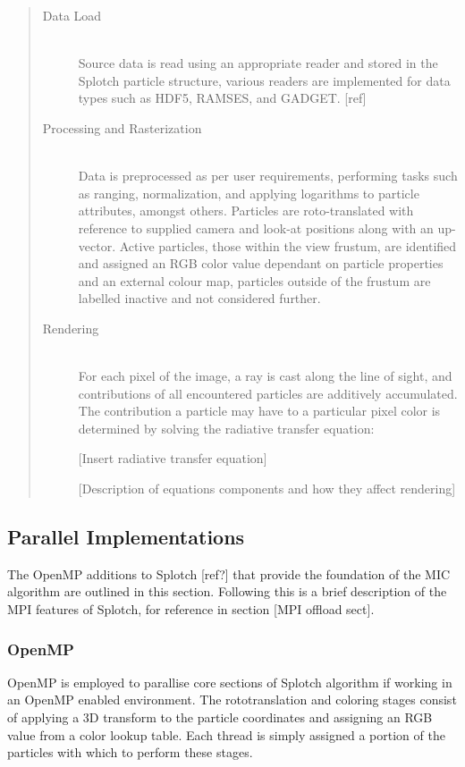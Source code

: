 \documentclass{easychair}
\begin{document}
\begin{quote} %
\begin{description}
  \item[Data Load] \hfill \\
  Source data is read using an appropriate reader and stored in the Splotch particle structure, various readers are 
  implemented for data types such as HDF5, RAMSES, and GADGET. [ref]
  \item[Processing and Rasterization] \hfill \\
   Data is preprocessed as per user requirements, performing tasks such as ranging, normalization, and applying 
   logarithms to particle attributes, amongst others. Particles are roto-translated with reference to supplied 
   camera and look-at positions along with an up-vector. Active particles, those within the view frustum, are 
   identified and assigned an RGB color value dependant on particle properties and an external colour map, 
   particles outside of the frustum are labelled inactive and not  considered further.  
  \item[Rendering] \hfill \\
  For each pixel of the image, a ray is cast along the line of sight, and contributions of all encountered particles 
  are additively accumulated. The contribution a particle may have to a particular pixel color is determined by solving 
  the radiative transfer equation:

  [Insert radiative transfer equation]

  [Description of equations components and how they affect rendering]
\end{description}
\end{quote}

\subsection{Parallel Implementations}
\label{sect:mpiopenmp}

The OpenMP additions to Splotch [ref?] that provide the foundation of the MIC algorithm are outlined in this section. 
Following this is a brief description of the MPI features of Splotch, for reference in section [MPI 
offload sect].

\subsubsection{OpenMP}
\label{sect:ompsplotch}

OpenMP is employed to parallise core sections of Splotch algorithm if working in an OpenMP enabled environment. 
The rototranslation and coloring stages consist of applying a 3D transform to the particle coordinates and assigning 
an RGB value from a color lookup table. Each thread is simply assigned a portion of the particles with which to 
perform these stages.
\end{document}
